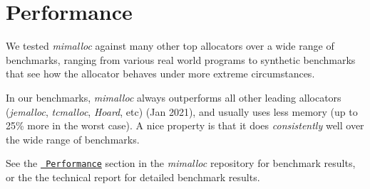 \chapter{Performance}
\hypertarget{bench}{}\label{bench}
We tested {\itshape mimalloc} against many other top allocators over a wide range of benchmarks, ranging from various real world programs to synthetic benchmarks that see how the allocator behaves under more extreme circumstances.

In our benchmarks, {\itshape mimalloc} always outperforms all other leading allocators ({\itshape jemalloc}, {\itshape tcmalloc}, {\itshape Hoard}, etc) (Jan 2021), and usually uses less memory (up to 25\% more in the worst case). A nice property is that it does {\itshape consistently} well over the wide range of benchmarks.

See the \href{https://github.com/microsoft/mimalloc\#Performance}{\texttt{ Performance}} section in the {\itshape mimalloc} repository for benchmark results, or the the technical report for detailed benchmark results. 